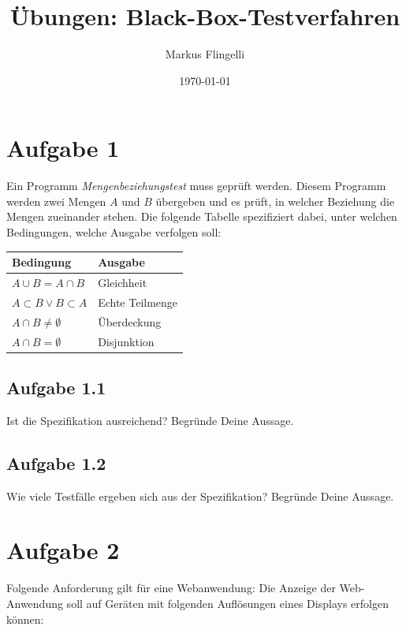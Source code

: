 

\title{Übungen: Black-Box-Testverfahren}
\author{Markus Flingelli}
\date{\today}


\maketitle

\section*{Aufgabe 1}
Ein Programm \emph{Mengenbeziehungstest} muss geprüft werden. Diesem Programm werden zwei Mengen $A$ und $B$ übergeben und es prüft, in welcher Beziehung die Mengen zueinander stehen. Die folgende Tabelle spezifiziert dabei, unter welchen Bedingungen, welche Ausgabe verfolgen soll:

\vspace{.3cm}

\begin{center}
\begin{tabular}{|l|l|}
\hline
\textbf{Bedingung} & \textbf{Ausgabe}\\ \hline
$A \cup B = A \cap B$ & Gleichheit\\ \hline
$A \subset B \lor B \subset A$ & Echte Teilmenge\\ \hline
$A \cap B \neq \emptyset$ & Überdeckung\\ \hline
$A \cap B = \emptyset$ & Disjunktion\\ \hline
\end{tabular}
\end{center}

\subsection*{Aufgabe 1.1}
Ist die Spezifikation ausreichend? Begründe Deine Aussage.

\subsection*{Aufgabe 1.2}
Wie viele Testfälle ergeben sich aus der Spezifikation? Begründe Deine Aussage.

\newpage
\section*{Aufgabe 2}

Folgende Anforderung gilt für eine Webanwendung: Die Anzeige der Web-Anwendung soll auf Geräten mit folgenden Auflösungen eines Displays erfolgen können:


